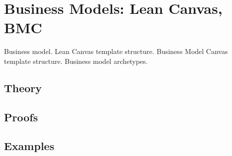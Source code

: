 
\section{Business Models: Lean Canvas, BMC}
\label{sec:2.6.12-business-models}

\begin{ticket}
Business model. Lean Canvas template structure. Business Model Canvas template structure. Business model archetypes.
\end{ticket}

\subsection*{Theory}

\subsection*{Proofs}

\subsection*{Examples}
